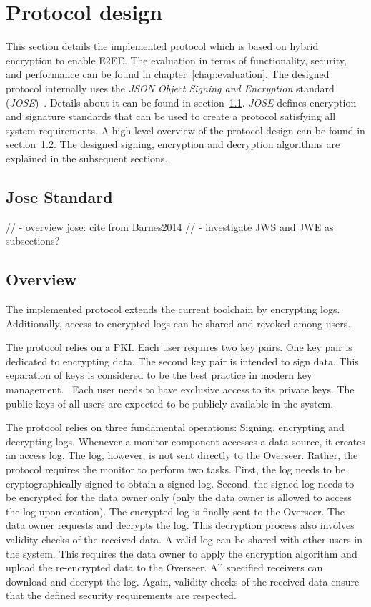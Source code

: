 \documentclass[../main.tex]{subfiles}
\begin{document}
\section{Protocol design}
\label{sec:protocol-design}

This section details the implemented protocol which is based on hybrid encryption to enable E2EE.
The evaluation in terms of functionality, security, and performance can be found in chapter~\ref{chap:evaluation}.
The designed protocol internally uses the \textit{JSON Object Signing and Encryption} standard (\textit{JOSE})~\cite{Barnes2014}.
Details about it can be found in section~\ref{sec:jose}.
\textit{JOSE} defines encryption and signature standards that can be used to create a protocol satisfying all system requirements.
A high-level overview of the protocol design can be found in section~\ref{sec:overview}.
The designed signing, encryption and decryption algorithms are explained in the subsequent sections. 

\subsection{Jose Standard}
\label{sec:jose}

// - overview jose: cite from Barnes2014
// - investigate JWS and JWE as subsections?


\subsection{Overview}
\label{sec:overview}

The implemented protocol extends the current toolchain by encrypting logs.
Additionally, access to encrypted logs can be shared and revoked among users.

The protocol relies on a PKI.
Each user requires two key pairs.
One key pair is dedicated to encrypting data.
The second key pair is intended to sign data.
This separation of keys is considered to be the best practice in modern key management.~
Each user needs to have exclusive access to its private keys.
The public keys of all users are expected to be publicly available in the system.

The protocol relies on three fundamental operations: 
Signing, encrypting and decrypting logs.
Whenever a monitor component accesses a data source, it creates an access log.
The log, however, is not sent directly to the Overseer. 
Rather, the protocol requires the monitor to perform two tasks.
First, the log needs to be cryptographically signed to obtain a signed log.
Second, the signed log needs to be encrypted for the data owner only (only the data owner is allowed to access the log upon creation).
The encrypted log is finally sent to the Overseer.
The data owner requests and decrypts the log.
This decryption process also involves validity checks of the received data.
A valid log can be shared with other users in the system.
This requires the data owner to apply the encryption algorithm and upload the re-encrypted data to the Overseer.
All specified receivers can download and decrypt the log.
Again, validity checks of the received data ensure that the defined security requirements are respected.
\end{document}
